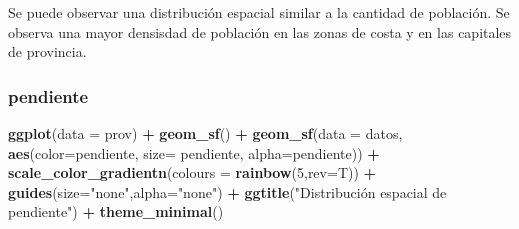\documentclass[12pt,a4paper,]{book}
\newenvironment{Shaded}{\begin{snugshade}}{\end{snugshade}}
\newcommand{\AttributeTok}[1]{\textcolor[rgb]{0.13,0.29,0.53}{#1}}
\newcommand{\CommentTok}[1]{\textcolor[rgb]{0.56,0.35,0.01}{\textit{#1}}}
\newcommand{\DecValTok}[1]{\textcolor[rgb]{0.00,0.00,0.81}{#1}}
\newcommand{\FunctionTok}[1]{\textcolor[rgb]{0.13,0.29,0.53}{\textbf{#1}}}
\newcommand{\NormalTok}[1]{#1}
\newcommand{\SpecialCharTok}[1]{\textcolor[rgb]{0.81,0.36,0.00}{\textbf{#1}}}
\newcommand{\StringTok}[1]{\textcolor[rgb]{0.31,0.60,0.02}{#1}}
\numberwithin{dummy}{section}
\theoremstyle{ocrenumbox}
\theoremstyle{blacknumex}
\theoremstyle{blacknumbox}
\theoremstyle{ocrenum}
\theoremstyle{ocrenum}
\begin{document}
\begin{Shaded}
\end{Shaded}

Se puede observar una distribución espacial similar a la cantidad de
población. Se observa una mayor densisdad de población en las zonas de
costa y en las capitales de provincia.

\hypertarget{pendiente}{%
\subsubsection*{pendiente}\label{pendiente}}

\begin{Shaded}
\begin{Highlighting}[]
\FunctionTok{ggplot}\NormalTok{(}\AttributeTok{data =}\NormalTok{ prov) }\SpecialCharTok{+} 
  \FunctionTok{geom\_sf}\NormalTok{() }\SpecialCharTok{+}
  \FunctionTok{geom\_sf}\NormalTok{(}\AttributeTok{data =}\NormalTok{ datos, }\FunctionTok{aes}\NormalTok{(}\AttributeTok{color=}\NormalTok{pendiente, }\AttributeTok{size=}\NormalTok{ pendiente, }\AttributeTok{alpha=}\NormalTok{pendiente)) }\SpecialCharTok{+}
    \FunctionTok{scale\_color\_gradientn}\NormalTok{(}\AttributeTok{colours =} \FunctionTok{rainbow}\NormalTok{(}\DecValTok{5}\NormalTok{,}\AttributeTok{rev=}\NormalTok{T)) }\SpecialCharTok{+}
  \FunctionTok{guides}\NormalTok{(}\AttributeTok{size=}\StringTok{"none"}\NormalTok{,}\AttributeTok{alpha=}\StringTok{"none"}\NormalTok{) }\SpecialCharTok{+}
  \FunctionTok{ggtitle}\NormalTok{(}\StringTok{"Distribución espacial de pendiente"}\NormalTok{) }\SpecialCharTok{+}
  \FunctionTok{theme\_minimal}\NormalTok{()}
\end{Highlighting}
\end{Shaded}
\end{document}
